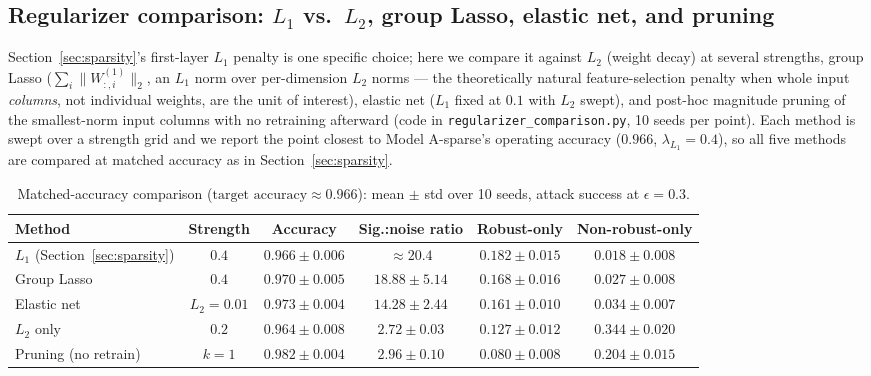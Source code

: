 \documentclass[11pt]{article}
\begin{document}
\subsection{Regularizer comparison: $L_1$ vs.\ $L_2$, group Lasso, elastic
net, and pruning}
\label{app:reg}

Section~\ref{sec:sparsity}'s first-layer $L_1$ penalty is one specific
choice; here we compare it against $L_2$ (weight decay) at several
strengths, group Lasso ($\sum_i \lVert W^{(1)}_{:,i} \rVert_2$, an $L_1$
norm over per-dimension $L_2$ norms --- the theoretically natural
feature-selection penalty when whole input \emph{columns}, not individual
weights, are the unit of interest), elastic net ($L_1$ fixed at $0.1$
with $L_2$ swept), and post-hoc magnitude pruning of the smallest-norm
input columns with no retraining afterward (code in
\texttt{regularizer\_comparison.py}, 10 seeds per point). Each method is
swept over a strength grid and we report the point closest to Model
A-sparse's operating accuracy ($0.966$, $\lambda_{L_1}=0.4$), so all five
methods are compared at matched accuracy as in Section~\ref{sec:sparsity}.

\begin{table}[h]
\centering
\caption{Matched-accuracy comparison ($\text{target accuracy} \approx
0.966$): mean $\pm$ std over 10 seeds, attack success at $\epsilon=0.3$.}
\label{tab:regcomparison}
\begin{tabular}{lccccc}
\toprule
Method & Strength & Accuracy & Sig.:noise ratio & Robust-only & Non-robust-only \\
\midrule
$L_1$ (Section~\ref{sec:sparsity}) & $0.4$ & $0.966\pm0.006$ & $\approx 20.4$ & $0.182\pm0.015$ & $0.018\pm0.008$ \\
Group Lasso & $0.4$ & $0.970\pm0.005$ & $18.88\pm5.14$ & $0.168\pm0.016$ & $0.027\pm0.008$ \\
Elastic net & $L_2=0.01$ & $0.973\pm0.004$ & $14.28\pm2.44$ & $0.161\pm0.010$ & $0.034\pm0.007$ \\
$L_2$ only & $0.2$ & $0.964\pm0.008$ & $2.72\pm0.03$ & $0.127\pm0.012$ & $0.344\pm0.020$ \\
Pruning (no retrain) & $k=1$ & $0.982\pm0.004$ & $2.96\pm0.10$ & $0.080\pm0.008$ & $0.204\pm0.015$ \\
\bottomrule
\end{tabular}
\end{table}
\end{document}
